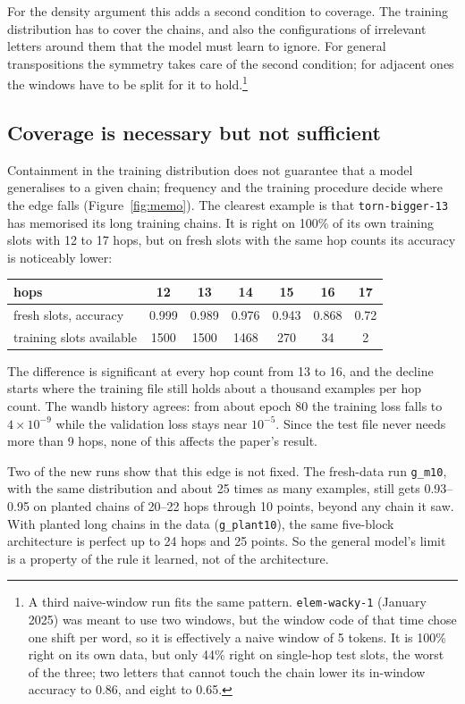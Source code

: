 \documentclass[11pt,a4paper]{article}
\newcommand{\tb}{\texttt{torn-bigger-13}}
\begin{document}
For the density argument this adds a second condition to coverage. The training distribution has to cover the chains, and also the configurations of irrelevant letters around them that the model must learn to ignore. For general transpositions the symmetry takes care of the second condition; for adjacent ones the windows have to be split for it to hold.\footnote{A third naive-window run fits the same pattern. \texttt{elem-wacky-1} (January 2025) was meant to use two windows, but the window code of that time chose one shift per word, so it is effectively a naive window of 5 tokens. It is 100\% right on its own data, but only 44\% right on single-hop test slots, the worst of the three; two letters that cannot touch the chain lower its in-window accuracy to 0.86, and eight to 0.65.}

\subsection{Coverage is necessary but not sufficient}\label{sec:closure}

Containment in the training distribution does not guarantee that a model generalises to a given chain; frequency and the training procedure decide where the edge falls (Figure~\ref{fig:memo}). The clearest example is that \tb{} has memorised its long training chains. It is right on 100\% of its own training slots with 12 to 17 hops, but on fresh slots with the same hop counts its accuracy is noticeably lower:

\begin{center}
\small
\begin{tabular}{lcccccc}
\toprule
hops & 12 & 13 & 14 & 15 & 16 & 17\\
\midrule
fresh slots, accuracy & 0.999 & 0.989 & 0.976 & 0.943 & 0.868 & 0.72\\
training slots available & 1500 & 1500 & 1468 & 270 & 34 & 2\\
\bottomrule
\end{tabular}
\end{center}

The difference is significant at every hop count from 13 to 16, and the decline starts where the training file still holds about a thousand examples per hop count. The wandb history agrees: from about epoch 80 the training loss falls to $4\times10^{-9}$ while the validation loss stays near $10^{-5}$. Since the test file never needs more than 9 hops, none of this affects the paper's result.

Two of the new runs show that this edge is not fixed. The fresh-data run \texttt{g\_m10}, with the same distribution and about 25 times as many examples, still gets 0.93--0.95 on planted chains of 20--22 hops through 10 points, beyond any chain it saw. With planted long chains in the data (\texttt{g\_plant10}), the same five-block architecture is perfect up to 24 hops and 25 points. So the general model's limit is a property of the rule it learned, not of the architecture.
\end{document}
